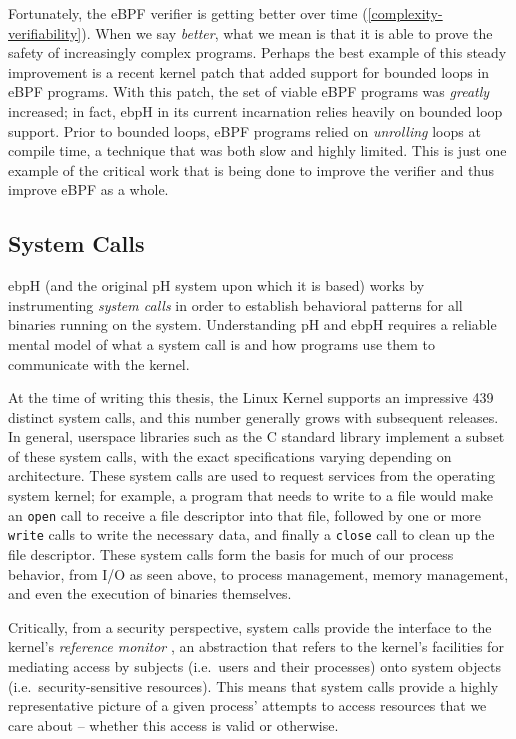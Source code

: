 \documentclass[
  12pt]{findlay}
\newcommand{\passthrough}[1]{#1}
\begin{document}
Fortunately, the eBPF verifier is getting better over time
(\autoref{complexity-verifiability}). When we say \emph{better}, what we
mean is that it is able to prove the safety of increasingly complex
programs. Perhaps the best example of this steady improvement is a
recent kernel patch \autocite{starovoitov19} that added support for
bounded loops in eBPF programs. With this patch, the set of viable eBPF
programs was \emph{greatly} increased; in fact, ebpH in its current
incarnation relies heavily on bounded loop support. Prior to bounded
loops, eBPF programs relied on \emph{unrolling} loops at compile time, a
technique that was both slow and highly limited. This is just one
example of the critical work that is being done to improve the verifier
and thus improve eBPF as a whole.

\hypertarget{system-calls}{%
\subsection{System Calls}\label{system-calls}}

ebpH (and the original pH system upon which it is based) works by
instrumenting \emph{system calls} in order to establish behavioral
patterns for all binaries running on the system. Understanding pH and
ebpH requires a reliable mental model of what a system call is and how
programs use them to communicate with the kernel.

At the time of writing this thesis, the Linux Kernel \autocite{unistd}
supports an impressive 439 distinct system calls, and this number
generally grows with subsequent releases. In general, userspace
libraries such as the C standard library implement a subset of these
system calls, with the exact specifications varying depending on
architecture. These system calls are used to request services from the
operating system kernel; for example, a program that needs to write to a
file would make an \passthrough{\lstinline!open!} call to receive a file
descriptor into that file, followed by one or more
\passthrough{\lstinline!write!} calls to write the necessary data, and
finally a \passthrough{\lstinline!close!} call to clean up the file
descriptor. These system calls form the basis for much of our process
behavior, from I/O as seen above, to process management, memory
management, and even the execution of binaries themselves.

Critically, from a security perspective, system calls provide the
interface to the kernel's \emph{reference monitor}
\autocite{jaeger08,vanoorschot19,anderson72}, an abstraction that refers
to the kernel's facilities for mediating access by subjects (i.e.~users
and their processes) onto system objects (i.e.~security-sensitive
resources). This means that system calls provide a highly representative
picture of a given process' attempts to access resources that we care
about -- whether this access is valid or otherwise.
\end{document}
